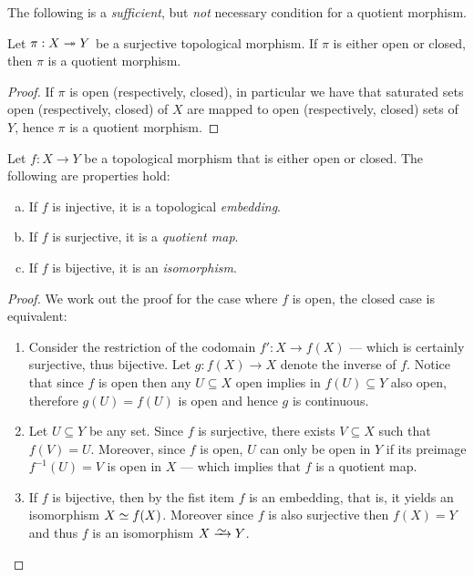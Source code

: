 The following is a \emph{sufficient}, but \emph{not} necessary condition for a
quotient morphism.

\begin{proposition}
Let \(\pi: X \twoheadrightarrow Y\) be a surjective topological morphism. If \(\pi\) is either
open or closed, then \(\pi\) is a quotient morphism.
\end{proposition}

\begin{proof}
If \(\pi\) is open (respectively, closed), in particular we have that saturated
sets open (respectively, closed) of \(X\) are mapped to open (respectively,
closed) sets of \(Y\), hence \(\pi\) is a quotient morphism.
\end{proof}

\begin{proposition}
\label{prop:map-open-or-closed-properties}
Let \(f: X \to Y\) be a topological morphism that is either open or closed. The
following are properties hold:
\begin{enumerate}[(a)]\setlength\itemsep{0em}
\item If \(f\) is injective, it is a topological \emph{embedding}.

\item If \(f\) is surjective, it is a \emph{quotient map}.

\item If \(f\) is bijective, it is an \emph{isomorphism}.
\end{enumerate}
\end{proposition}

\begin{proof}
We work out the proof for the case where \(f\) is open, the closed case is
equivalent:
\begin{enumerate}\setlength\itemsep{0em}
\item Consider the restriction of the codomain \(f': X \to f(X)\) --- which is
  certainly surjective, thus bijective. Let \(g: f(X) \to X\) denote the inverse
  of \(f\). Notice that since \(f\) is open then any \(U \subseteq X\) open
  implies in \(f(U) \subseteq Y\) also open, therefore \(g(U) = f(U)\) is open
  and hence \(g\) is continuous.

\item Let \(U \subseteq Y\) be any set. Since \(f\) is surjective, there exists
  \(V \subseteq X\) such that \(f(V) = U\). Moreover, since \(f\) is open, \(U\)
  can only be open in \(Y\) if its preimage \(f^{-1}(U) = V\) is open in \(X\)
  --- which implies that \(f\) is a quotient map.

\item If \(f\) is bijective, then by the fist item \(f\) is an embedding, that
  is, it yields an isomorphism \(X \simeq f(X)\). Moreover since \(f\) is also
  surjective then \(f(X) = Y\) and thus \(f\) is an isomorphism \(X \isoto Y\).
\end{enumerate}
\end{proof}

